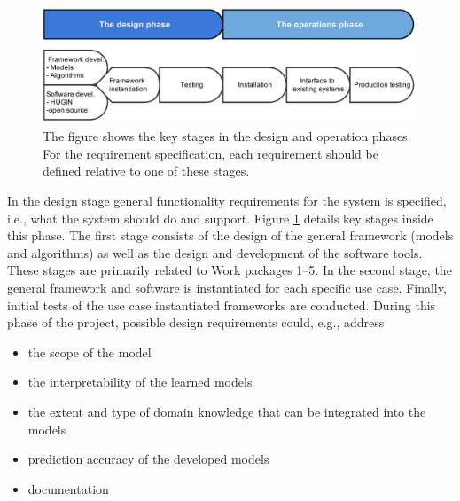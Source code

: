 
\begin{figure}[htbp]
\centering
\includegraphics [keepaspectratio,width = 14cm] {amidst_phases}
\caption{The figure shows the key stages in the design and operation phases. For the requirement specification, each
  requirement should be defined relative to one of these stages.} 
\label{REprocess2}
\end{figure}




In the design stage general functionality requirements for the system is specified, i.e., what the system should do and support.
Figure \ref{REprocess2} details key stages inside this phase. The first stage consists of the design of the general
framework (models and algorithms) as well as the design and development of the software tools. These stages are primarily
related to Work packages 1--5. In the second stage, the general framework and software is instantiated for each specific
use case. Finally, initial tests of the use case instantiated frameworks are conducted.  During this phase of the project, possible design requirements could, e.g., address
\begin{itemize}
 \item the scope of the model
 \item the interpretability of the learned models
 \item the extent and type of domain knowledge that can be integrated into the models
 \item prediction accuracy of the developed models
 \item documentation
\end{itemize}

